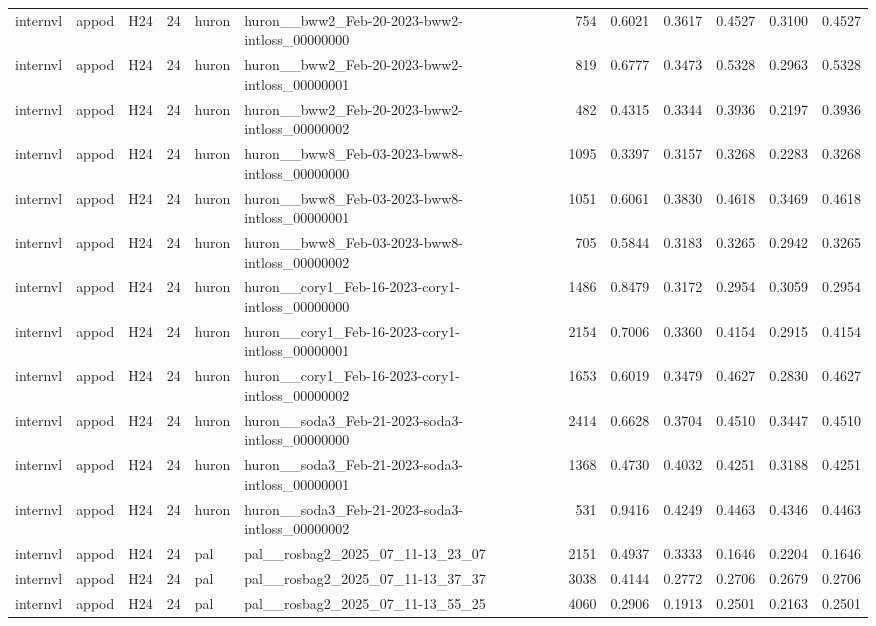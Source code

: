 \begin{table}[tbp]
\begin{tabular}{lllrllrrrrrr}
internvl & appod & H24 & 24 & huron & huron\_\_bww2\_Feb-20-2023-bww2-intloss\_00000000 & 754 & 0.6021 & 0.3617 & 0.4527 & 0.3100 & 0.4527 \\
internvl & appod & H24 & 24 & huron & huron\_\_bww2\_Feb-20-2023-bww2-intloss\_00000001 & 819 & 0.6777 & 0.3473 & 0.5328 & 0.2963 & 0.5328 \\
internvl & appod & H24 & 24 & huron & huron\_\_bww2\_Feb-20-2023-bww2-intloss\_00000002 & 482 & 0.4315 & 0.3344 & 0.3936 & 0.2197 & 0.3936 \\
internvl & appod & H24 & 24 & huron & huron\_\_bww8\_Feb-03-2023-bww8-intloss\_00000000 & 1095 & 0.3397 & 0.3157 & 0.3268 & 0.2283 & 0.3268 \\
internvl & appod & H24 & 24 & huron & huron\_\_bww8\_Feb-03-2023-bww8-intloss\_00000001 & 1051 & 0.6061 & 0.3830 & 0.4618 & 0.3469 & 0.4618 \\
internvl & appod & H24 & 24 & huron & huron\_\_bww8\_Feb-03-2023-bww8-intloss\_00000002 & 705 & 0.5844 & 0.3183 & 0.3265 & 0.2942 & 0.3265 \\
internvl & appod & H24 & 24 & huron & huron\_\_cory1\_Feb-16-2023-cory1-intloss\_00000000 & 1486 & 0.8479 & 0.3172 & 0.2954 & 0.3059 & 0.2954 \\
internvl & appod & H24 & 24 & huron & huron\_\_cory1\_Feb-16-2023-cory1-intloss\_00000001 & 2154 & 0.7006 & 0.3360 & 0.4154 & 0.2915 & 0.4154 \\
internvl & appod & H24 & 24 & huron & huron\_\_cory1\_Feb-16-2023-cory1-intloss\_00000002 & 1653 & 0.6019 & 0.3479 & 0.4627 & 0.2830 & 0.4627 \\
internvl & appod & H24 & 24 & huron & huron\_\_soda3\_Feb-21-2023-soda3-intloss\_00000000 & 2414 & 0.6628 & 0.3704 & 0.4510 & 0.3447 & 0.4510 \\
internvl & appod & H24 & 24 & huron & huron\_\_soda3\_Feb-21-2023-soda3-intloss\_00000001 & 1368 & 0.4730 & 0.4032 & 0.4251 & 0.3188 & 0.4251 \\
internvl & appod & H24 & 24 & huron & huron\_\_soda3\_Feb-21-2023-soda3-intloss\_00000002 & 531 & 0.9416 & 0.4249 & 0.4463 & 0.4346 & 0.4463 \\
internvl & appod & H24 & 24 & pal & pal\_\_rosbag2\_2025\_07\_11-13\_23\_07 & 2151 & 0.4937 & 0.3333 & 0.1646 & 0.2204 & 0.1646 \\
internvl & appod & H24 & 24 & pal & pal\_\_rosbag2\_2025\_07\_11-13\_37\_37 & 3038 & 0.4144 & 0.2772 & 0.2706 & 0.2679 & 0.2706 \\
internvl & appod & H24 & 24 & pal & pal\_\_rosbag2\_2025\_07\_11-13\_55\_25 & 4060 & 0.2906 & 0.1913 & 0.2501 & 0.2163 & 0.2501 \\

\end{tabular}
\end{table}
